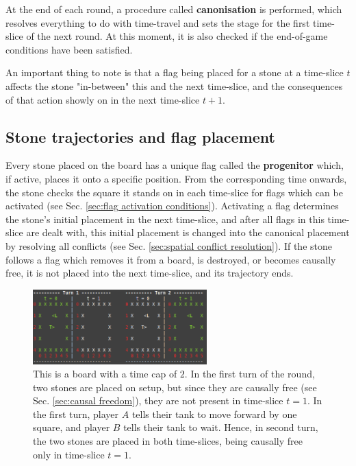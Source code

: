 \documentclass[12pt]{article}
\begin{document}
	At the end of each round, a procedure called \textbf{canonisation} is performed, which resolves everything to do with time-travel and sets the stage for the first time-slice of the next round. At this moment, it is also checked if the end-of-game conditions have been satisfied.
	
	An important thing to note is that a flag being placed for a stone at a time-slice $t$ affects the stone "in-between" this and the next time-slice, and the consequences of that action showly on in the next time-slice $t+1$.
	
	\subsection{Stone trajectories and flag placement}
	Every stone placed on the board has a unique flag called the \textbf{progenitor} which, if active, places it onto a specific position. From the corresponding time onwards, the stone checks the square it stands on in each time-slice for flags which can be activated (see Sec. \ref{sec:flag activation conditions}). Activating a flag determines the stone's initial placement in the next time-slice, and after all flags in this time-slice are dealt with, this initial placement is changed into the canonical placement by resolving all conflicts (see Sec. \ref{sec:spatial conflict resolution}). If the stone follows a flag which removes it from a board, is destroyed, or becomes causally free, it is not placed into the next time-slice, and its trajectory ends.
	
	\begin{figure}[h]
\begin{center}

    \includegraphics[width=0.6\textwidth]{images/diag_placing_flags}
 \caption{This is a board with a time cap of $2$. In the first turn of the round, two stones are placed on setup, but since they are causally free (see Sec. \ref{sec:causal freedom}), they are not present in time-slice $t=1$. In the first turn, player $A$ tells their tank to move forward by one square, and player $B$ tells their tank to wait. Hence, in second turn, the two stones are placed in both time-slices, being causally free only in time-slice $t=1$.}\label{fig:placing flags}
\end{center}
\end{figure}
	
\end{document}
